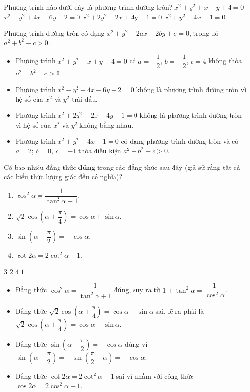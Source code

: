\begin{ex}%
	Phương trình nào dưới đây là phương trình đường tròn?
	\choice
	{$x^2+y^2+x+y+4=0$}
	{$x^2-y^2+4x-6y-2=0$}
	{$x^2+2y^2-2x+4y-1=0$}
	{\True $x^2+y^2-4x-1=0$}
	\loigiai
	{Phương trình đường tròn có dạng $ x^2 + y^2 - 2ax - 2by + c = 0 $, trong đó $ a^2 + b^2 - c > 0 $.
		\begin{itemize}
			\item Phương trình $x^2+y^2+x+y+4=0$ có $ a = -\dfrac{1}{2} $, $ b = -\dfrac{1}{2}$, $ c=4 $ không thỏa   $a^2+b^2-c>0$.
			\item Phương trình $x^2-y^2+4x-6y-2=0$ không là phương trình đường tròn vì hệ số của $x^2$ và $y^2$ trái dấu.
			\item Phương trình $x^2+2y^2-2x+4y-1=0$ không là phương trình đường tròn vì hệ số của $x^2$ và $y^2$ không bằng nhau.
			\item Phương trình $x^2+y^2-4x-1=0$ có dạng phương trình đường tròn và có $ a = 2$; $b = 0 $, $ c = -1 $ thỏa điều kiện $a^2+b^2-c>0$.
		\end{itemize}
	}
\end{ex}
\begin{ex}%
	Có bao nhiêu đẳng thức \textbf{đúng} trong các đẳng thức sau đây (giả sử rằng tất cả các biểu thức lượng giác đều có nghĩa)?
	\begin{enumerate}
		\item $\cos^2\alpha=\dfrac{1}{\tan^2\alpha+1}$.
		\item $\sqrt{2}\cos\left(\alpha+\dfrac{\pi}{4}\right)=\cos\alpha+\sin\alpha$.
		\item $\sin\left(\alpha-\dfrac{\pi}{2}\right)=-\cos\alpha$.
		\item $\cot 2\alpha=2\cot^2\alpha-1$.
	\end{enumerate}
	\choice
	{$3$}
	{\True $2$}
	{$4$}
	{$1$}
	\loigiai
	{
		\begin{itemize}
			\item Đẳng thức $\cos^2\alpha=\dfrac{1}{\tan^2\alpha+1}$ đúng, suy ra từ $1+\tan^2\alpha=\dfrac{1}{\cos^2\alpha}$.
			\item Đẳng thức $\sqrt{2}\cos\left(\alpha+\dfrac{\pi}{4}\right)=\cos\alpha+\sin\alpha$ sai, lẽ ra phải là $\sqrt{2}\cos\left(\alpha+\dfrac{\pi}{4}\right)=\cos\alpha-\sin\alpha$.
			\item Đẳng thức $\sin\left(\alpha-\dfrac{\pi}{2}\right)=-\cos\alpha$ đúng vì $\sin\left(\alpha-\dfrac{\pi}{2}\right)=-\sin\left(\dfrac{\pi}{2}-\alpha\right)=-\cos \alpha$.
			\item Đẳng thức $\cot 2\alpha=2\cot^2\alpha-1$ sai vì nhầm với công thức $\cos 2\alpha=2\cos^2\alpha-1$.
		\end{itemize}
	}
\end{ex}
